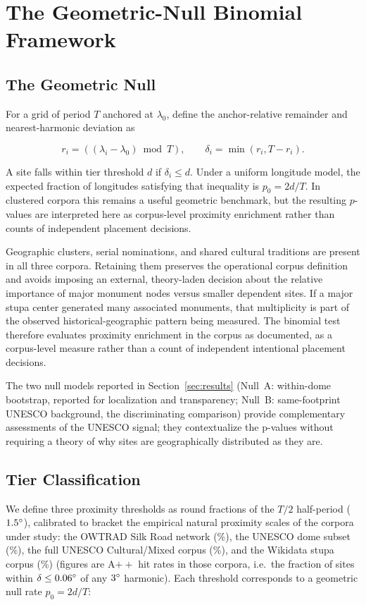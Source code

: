 \documentclass[12pt,a4paper]{article}
\newcommand{\degr}{\ifmmode^\circ\else\textdegree{}\fi}
\begin{document}
\section{The Geometric-Null Binomial Framework}
\label{sec:framework}

\subsection{The Geometric Null}

For a grid of period $T$ anchored at $\lambda_0$, define the
anchor-relative remainder and nearest-harmonic deviation as

\[
r_i = ((\lambda_i - \lambda_0) \bmod T), \qquad
\delta_i = \min(r_i, T-r_i).
\]

A site falls within tier threshold $d$ if $\delta_i \leq d$. Under a
uniform longitude model, the expected fraction of longitudes satisfying
that inequality is $p_0 = 2d/T$. In clustered corpora this remains a
useful geometric benchmark, but the resulting $p$-values are
interpreted here as corpus-level proximity enrichment rather than
counts of independent placement decisions.

Geographic clusters, serial nominations, and shared cultural traditions
are present in all three corpora. Retaining them preserves the
operational corpus definition and avoids imposing an external,
theory-laden decision about the relative importance of major monument
nodes versus smaller dependent sites. If a major stupa center generated
many associated monuments, that multiplicity is part of the observed
historical-geographic pattern being measured. The binomial test
therefore evaluates proximity enrichment in the corpus as documented,
as a corpus-level measure rather than a count of independent
intentional placement decisions.

The two null models reported in Section~\ref{sec:results}
(Null~A: within-dome bootstrap, reported for localization and
transparency; Null~B: same-footprint UNESCO background, the
discriminating comparison) provide complementary assessments of the UNESCO
signal; they contextualize the p-values without requiring a theory of
why sites are geographically distributed as they are.

\subsection{Tier Classification}

We define three proximity thresholds as round fractions of the $T/2$
half-period ($1.5\degr$), calibrated to bracket the empirical natural
proximity scales of the corpora under study: the OWTRAD Silk Road
network (\naturalNullPctOwtrad{}\%), the UNESCO dome subset (\naturalNullPctDome{}\%), the full UNESCO
Cultural/Mixed corpus (\naturalNullPctFull{}\%), and the Wikidata stupa corpus (\naturalNullPctWiki{}\%)
(figures are A$++$ hit rates in those corpora, i.e.\ the fraction of
sites within $\delta \leq \AppThreshDeg\degr$ of any $3\degr$ harmonic).
Each threshold corresponds to a geometric null rate $p_0 = 2d/T$:
\end{document}
